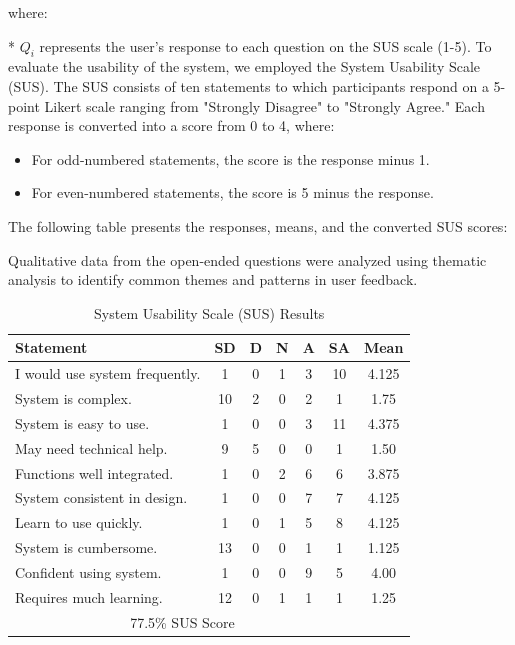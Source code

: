 \documentclass[conference]{IEEEtran}
\begin{document}
where:

* $Q_i$ represents the user's response to each question on the SUS scale (1-5).
To evaluate the usability of the system, we employed the System Usability Scale (SUS). The SUS consists of ten statements to which participants respond on a 5-point Likert scale ranging from "Strongly Disagree" to "Strongly Agree." Each response is converted into a score from 0 to 4, where:

\begin{itemize}
    \item For odd-numbered statements, the score is the response minus 1.
    \item For even-numbered statements, the score is 5 minus the response.
\end{itemize}

The following table presents the responses, means, and the converted SUS scores:

Qualitative data from the open-ended questions were analyzed using thematic analysis to identify common themes and patterns in user feedback. 
\begin{table}[ht]
    \centering
    \caption{System Usability Scale (SUS) Results}
    \begin{tabular}{l|ccccc|c}
    \hline
    \textbf{Statement} & \textbf{SD} & \textbf{D} & \textbf{N} & \textbf{A} & \textbf{SA} & \textbf{Mean} \\ \hline
    I would use system frequently. & 1 & 0 & 1 & 3 & 10 & 4.125 \\
    System is complex. & 10 & 2 & 0 & 2 & 1 & 1.75 \\
    System is easy to use. & 1 & 0 & 0 & 3 & 11 & 4.375 \\
    May need technical help. & 9 & 5 & 0 & 0 & 1 & 1.50 \\
    Functions well integrated. & 1 & 0 & 2 & 6 & 6 & 3.875 \\
    System consistent in design. & 1 & 0 & 0 & 7 & 7 & 4.125 \\
    Learn to use quickly. & 1 & 0 & 1 & 5 & 8 & 4.125 \\
    System is cumbersome. & 13 & 0 & 0 & 1 & 1 & 1.125 \\
    Confident using system. & 1 & 0 & 0 & 9 & 5 & 4.00 \\
    Requires much learning. & 12 & 0 & 1 & 1 & 1 & 1.25 \\ \hline
    \multicolumn{6}{c|}{77.5\% SUS Score} & \\ \hline
    \end{tabular}
    \label{tab:sus_results}
    \end{table}
\end{document}
